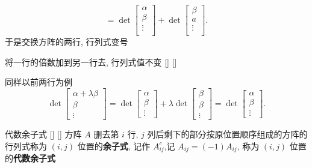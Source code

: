 \documentclass[UTF8]{ctexart}
\DeclareMathOperator{\0}{\mathbf{0}}
\DeclareMathOperator{\<}{\langle}
\renewcommand{\>}{\rangle}
\begin{document}
\begin{prf}
    \[
    = \det  \begin{bmatrix}
        \alpha \\
        \beta\\
        \vdots  \\
    
    \end{bmatrix} 
    + \det \begin{bmatrix}
    \beta  \\
        a \\
        \vdots \\
        
    \end{bmatrix}.
    \]
    于是交换方阵的两行, 行列式变号
    \end{prf}

    \begin{crl}
			[]
			{将一行的倍数加到另一行去, 行列式值不变}
			[]
			[]
    \end{crl}
    \begin{prf}
    同样以前两行为例
    \[  \det
    \begin{bmatrix}
    \alpha+\lambda\beta \\
    \beta \\
    \vdots
    \end{bmatrix}=\det
    \begin{bmatrix}
    \alpha \\
    \beta \\
    \vdots
    \end{bmatrix}+\lambda\det
    \begin{bmatrix}
    \beta \\
    \beta \\
    \vdots
    \end{bmatrix}=\det
    \begin{bmatrix}
    \alpha \\
    \beta \\
    \vdots
    \end{bmatrix}.\]
    \end{prf}

    \begin{dfn}
			[]
			{代数余子式}
			[]
			[]
	    方阵 \(A\) 删去第 \(i\) 行, \(j\) 列后剩下的部分按原位置顺序组成的方阵的行列式称为 \((i,j)\) 位置的\textbf{余子式}, 记作 \(A_{ij}^{c}\),记 \(A_{ij}=(-1)A_{ij}\), 称为 \((i,j)\) 位置的\textbf{代数余子式}
	\end{dfn}
\end{document}
